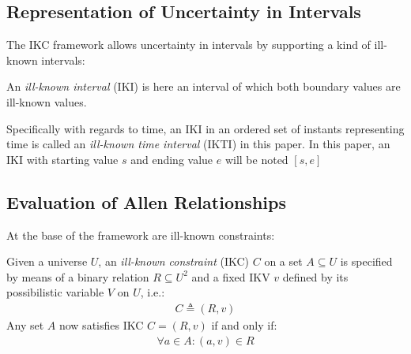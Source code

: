 

\subsection{\label{subsec:ikc-interval}Representation of Uncertainty in Intervals}
The IKC framework allows uncertainty in intervals by supporting a kind of ill-known intervals:

\begin{definition}
An \emph{ill-known interval} (IKI) is here an interval of which both boundary values are ill-known values.
\end{definition}


Specifically with regards to time, an IKI in an ordered set of instants representing time is called an \emph{ill-known time interval} (IKTI) in this paper. In this paper, an IKI with starting value $s$ and ending value $e$ will be noted $\left[s, e\right]$

\subsection{\label{subsec:ikc-evaluation}Evaluation of Allen Relationships}
At the base of the framework are ill-known constraints:



\begin{definition}
Given a universe $U$, an \emph{ill-known constraint} (IKC) $C$ on a set $A \subseteq U$ is specified by means of a binary relation $R \subseteq U^{2}$ and a fixed IKV $v$ defined by its possibilistic variable $V$ on $U$, i.e.:
\begin{align}
C \triangleq (R,v)
\end{align}
Any set $A$ now satisfies IKC $C = (R,v)$ if and only if:
\begin{align}
\forall a \in A : (a,v) \in R
\end{align}
\end{definition}

